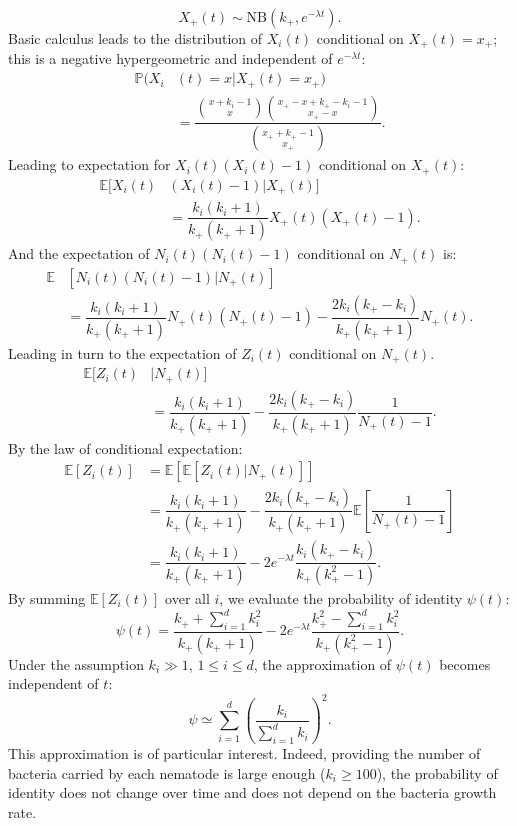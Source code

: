 \documentclass[10pt]{article}
\newcommand{\pr}{{\mathbb{P}}}
\begin{document}
\begin{boxframe}
\begin{multicols}{2}
\begin{equation}
 X_+(t)  \sim \mathrm{NB} \left( k_+, e^{-\lambda t} \right).
\end{equation}
Basic calculus leads to the distribution of $X_i(t)$ conditional on $ X_+(t)=x_+ $; this is a negative hypergeometric and independent of $e^{-\lambda t}$:
\begin{align}
\pr( X_i & (t) =x \vert X_+(t)=x_+ )  \nonumber \\ 
& = \dfrac{\displaystyle \binom{x+k_i-1}{x} \binom{x_+-x+k_+-k_i-1}{x_+-x}}{\displaystyle \binom{x_+ +k_+ -1}{x_+}}.
\end{align}
Leading to expectation for $X_i(t)(X_i(t)-1)$ conditional on $X_+(t)$:
\begin{align}
 \mathbb{E} [ X_i(t)& (X_i(t)-1) \vert X_+(t) ]  \nonumber \\
 &=\dfrac{k_i(k_i+1)}{k_+ (k_+ +1 )}X_+(t) ( X_+(t) -1 ).
\end{align}
And the expectation of $N_i(t)(N_i(t)-1)$ conditional on $N_+(t)$ is:
\begin{align}
 \mathbb{E} & [ N_i(t) (N_i(t)-1) \vert N_+(t) ]   \nonumber \\
 &=\dfrac{k_i(k_i+1) }{k_+ (k_+ +1)}N_+(t) ( N_+(t) -1 ) -\dfrac{2 k_i (k_+ - k_i) }{k_+ (k_+ +1)} N_+(t) .
\end{align}
Leading in turn to the expectation of $Z_i(t)$ conditional on $N_+(t)$.
\begin{align}
  \mathbb{E} [  Z_i(t)  & \vert N_+(t) ]  \nonumber \\
 &= \dfrac{k_i(k_i+1)}{k_+ (k_+ +1)}- \dfrac{2 k_i (k_+ -k_i)}{k_+ (k_+ +1)} \dfrac{1}{ N_+(t) -1  }.
\end{align}
By the law of conditional expectation:
\begin{align}
\mathbb{E}\left[ Z_i(t) \right] &= 
 \mathbb{E}\left[ \mathbb{E}\left[ \left. Z_i(t) \right\vert N_+(t) \right] \right]\\
 &=\dfrac{k_i(k_i+1)}{k_+ (k_+ +1 )}-\dfrac{2 k_i (k_+ -k_i)}{k_+ (k_+ +1 )}\mathbb{E}\left[\dfrac{1}{N_+(t)-1} \right] \\
 & =\dfrac{k_i(k_i+1)}{k_+ (k_+ +1 )}-2e^{-\lambda t}\dfrac{ k_i (k_+ -k_i)}{k_+ (k_+^2 -1 )}.
\end{align}
By summing $\mathbb{E}\left[ Z_i(t) \right]$ over all $i$, we evaluate the probability of identity $\psi(t)$:
\begin{equation}
\psi(t) =\dfrac{ k_+ + \sum_{i=1}^d k_i^2}{k_+ (k_+ +1)}  -2 e^{-\lambda t} \dfrac{ k_+^2-\sum_{i=1}^d k_i^2}{k_+ (k_+^2 -1) }.
\end{equation}
Under the assumption $k_i \gg 1$, $ 1 \leq i \leq d $, the approximation of $\psi(t)$ becomes independent of $t$:
 \begin{equation}
\psi \simeq \displaystyle \sum_{i=1}^d \left( \dfrac{ k_i}{\sum_{i=1}^d k_i} \right)^2.  \label{eqn:star} \tag{$\ast$}
 \end{equation}
 This approximation is of particular interest. Indeed, providing the number of bacteria carried by each nematode is large enough ($k_i \geq 100$), the probability of identity does not change over time and does not depend on 
 the bacteria growth rate.
 \end{multicols}
\end{boxframe}
\end{document}

